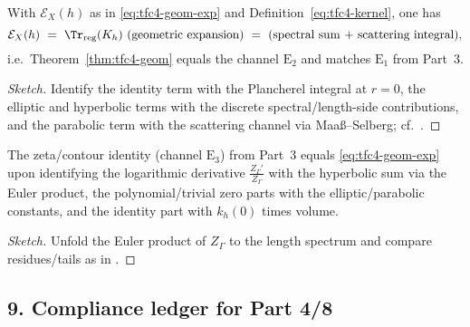 \begin{proposition}[Spectral = geometric]\relax\hspace{0pt}
\label{prop:tfc4-spec-geom} %
With $\mathcal{E}_X(h)$ as in \eqref{eq:tfc4-geom-exp} and Definition~\eqref{eq:tfc4-kernel}, one has
\[
\mathcal{E}_X(h)\ =\ \Tr_{\mathrm{reg}}(K_h)\ \text{(geometric expansion)}\ =\ \text{(spectral sum + scattering integral)},
\]
i.e.\ Theorem~\ref{thm:tfc4-geom} equals the channel $\mathrm{E}_2$ and matches $\mathrm{E}_1$ from Part~3. \relax\hspace{0pt}
\end{proposition}

\begin{proof}[Sketch]\relax\hspace{0pt}
Identify the identity term with the Plancherel integral at $r=0$, the elliptic and hyperbolic terms with the discrete spectral/length-side contributions, and the parabolic term with the scattering channel via Maaß--Selberg; cf.\ \cite{HejhalI,HejhalII}. \relax\hspace{0pt}
\end{proof}

\begin{proposition}[Zeta = geometric]\relax\hspace{0pt}
\label{prop:tfc4-zeta-geom} %
The zeta/contour identity (channel $\mathrm{E}_3$) from Part~3 equals \eqref{eq:tfc4-geom-exp} upon identifying the logarithmic derivative $\frac{Z_\Gamma'}{Z_\Gamma}$ with the hyperbolic sum via the Euler product, the polynomial/trivial zero parts with the elliptic/parabolic constants, and the identity part with $k_h(0)$ times volume. \relax\hspace{0pt}
\end{proposition}

\begin{proof}[Sketch]\relax\hspace{0pt}
Unfold the Euler product of $Z_\Gamma$ to the length spectrum and compare residues/tails as in \cite{SelbergCollected,HejhalII,IwaniecSpectral}. \relax\hspace{0pt}
\end{proof}

\subsection*{9. Compliance ledger for Part 4/8}\relax\hspace{0pt}
\label{subsec:tfc4-compliance} %

